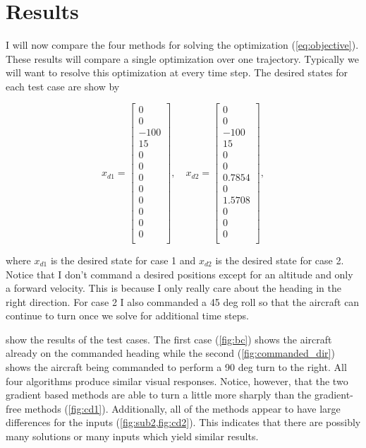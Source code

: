 \documentclass{article}
\begin{document}
\section*{Results}

I will now compare the four methods for solving the optimization (\cref{eq:objective}). These results will compare a single optimization over one trajectory. Typically we will want to resolve this optimization at every time step. The desired states for each test case are show by

\begin{equation}
x_{d1}=
\begin{bmatrix}
	0 \\ 0 \\ -100 \\ 15 \\ 0 \\ 0 \\ 0 \\ 0 \\ 0 \\ 0 \\ 0 \\ 0 \\
\end{bmatrix},  \quad
x_{d2}=
\begin{bmatrix}
0 \\ 0 \\ -100 \\ 15 \\ 0 \\ 0 \\ 0.7854 \\ 0 \\ 1.5708 \\ 0 \\ 0 \\ 0 \\
\end{bmatrix}, 
\end{equation}

where $x_{d1}$ is the desired state for case 1 and $x_{d2}$ is the desired state for case 2. Notice that I don't command a desired positions except for an altitude and only a forward velocity. This is because I only really care about the heading in the right direction. For case 2 I also commanded a 45 deg roll so that the aircraft can continue to turn once we solve for additional time steps.


 show the results of the test cases. The first case (\cref{fig:bc}) shows the aircraft already on the commanded heading while the second (\cref{fig:commanded_dir}) shows the aircraft being commanded to perform a 90 deg turn to the right. All four algorithms produce similar visual responses. Notice, however, that the two gradient based methods are able to turn a little more sharply than the gradient-free methods (\cref{fig:cd1}). Additionally, all of the methods appear to have large differences for the inputs (\cref{fig:sub2,fig:cd2}). This indicates that there are possibly many solutions or many inputs which yield similar results.
\end{document}
